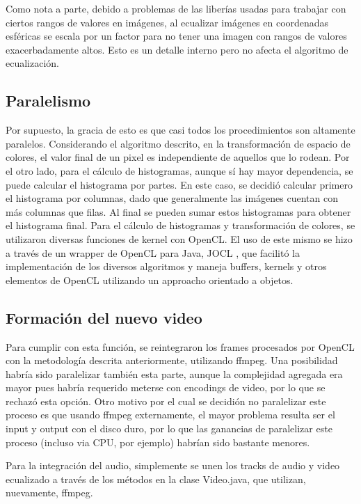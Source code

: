 \documentclass[12pt,spanish]{article}
\begin{document}
	Como nota a parte, debido a problemas de las liber\'ias usadas para trabajar con ciertos rangos de valores en im\'agenes, al ecualizar im\'agenes en coordenadas esf\'ericas se escala por un factor para no tener una imagen con rangos de valores exacerbadamente altos. Esto es un detalle interno pero no afecta el algoritmo de ecualizaci\'on.

	\subsection{Paralelismo}
	Por supuesto, la gracia de esto es que casi todos los procedimientos son altamente paralelos. Considerando el algoritmo descrito, en la transformaci\'on de espacio de colores, el valor final de un pixel es independiente de aquellos que lo rodean.
	Por el otro lado, para el c\'alculo de histogramas, aunque s\'i hay mayor dependencia, se puede calcular el histograma por partes. En este caso, se decidi\'o calcular primero el histograma por columnas, dado que generalmente las im\'agenes cuentan con m\'as columnas que filas. Al final se pueden sumar estos histogramas para obtener el histograma final.
	Para el c\'alculo de histogramas y transformaci\'on de colores, se utilizaron diversas funciones de kernel con OpenCL. El uso de este mismo se hizo a trav\'es de un wrapper de OpenCL para Java, JOCL \cite{JOCL}, que facilit\'o la implementaci\'on de los diversos algoritmos y maneja buffers, kernels y otros elementos de OpenCL utilizando un approacho orientado a objetos.	

	\subsection{Formaci\'on del nuevo video}
	Para cumplir con esta funci\'on, se reintegraron los frames procesados por OpenCL con la metodolog\'ia descrita anteriormente, utilizando ffmpeg. Una posibilidad habr\'ia sido paralelizar tambi\'en esta parte, aunque la complejidad agregada era mayor pues habr\'ia requerido meterse con encodings de video, por lo que se rechaz\'o esta opci\'on. Otro motivo por el cual se decidi\'on no paralelizar este proceso es que usando ffmpeg externamente, el mayor problema resulta ser el input y output con el disco duro, por lo que las ganancias de paralelizar este proceso (incluso via CPU, por ejemplo) habr\'ian sido bastante menores.

	Para la integraci\'on del audio, simplemente se unen los tracks de audio y video ecualizado a trav\'es de los m\'etodos en la clase Video.java, que utilizan, nuevamente, ffmpeg.
\end{document}
